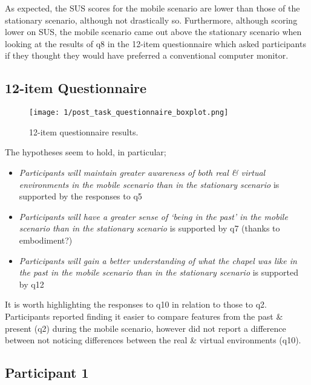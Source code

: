 As expected, the SUS scores for the mobile scenario are lower than those of the stationary scenario, although not drastically so. Furthermore, although scoring lower on SUS, the mobile scenario came out above the stationary scenario when looking at the results of q8 in the 12-item questionnaire which asked participants if they thought they would have preferred a conventional computer monitor.

\pagebreak

\subsection{12-item Questionnaire}

\begin{figure}[h]
	\begin{center}
		\texttt{[image: 1/post\_task\_questionnaire\_boxplot.png]}
		\caption{12-item questionnaire results.}
		\label{12-item_boxplot}
	\end{center}
\end{figure}

The hypotheses seem to hold, in particular;

\begin{itemize}
	\item \textit{Participants will maintain greater awareness of both real \& virtual environments in the mobile scenario than in the stationary scenario} is supported by the responses to q5
	\item \textit{Participants will have a greater sense of `being in the past' in the mobile scenario than in the stationary scenario} is supported by q7 (thanks to embodiment?)
	\item \textit{Participants will gain a better understanding of what the chapel was like in the past in the mobile scenario than in the stationary scenario} is supported by q12
\end{itemize}

It is worth highlighting the responses to q10 in relation to those to q2. Participants reported finding it easier to compare features from the past \& present (q2) during the mobile scenario, however did not report a difference between not noticing differences between the real \& virtual environments (q10).


\clearpage

\subsection{Participant 1}

